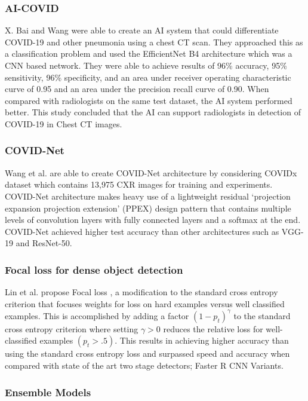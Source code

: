 \documentclass{sigkddExp}
\begin{document}
\subsubsection{AI-COVID}

X. Bai and Wang \cite{pmid32339081} were able to create an AI system that could
differentiate COVID-19 and other pneumonia using a chest CT scan. They
approached this as a classification problem and used the EfficientNet B4
architecture which was a CNN based network. They were able to achieve results of
96\% accuracy, 95\% sensitivity, 96\% specificity, and an area under receiver
operating characteristic curve of 0.95 and an area under the precision recall
curve of 0.90. When compared with radiologists on the same test dataset, the AI
system performed better. This study concluded that the AI can support
radiologists in detection of COVID-19 in Chest CT images.

\subsubsection{COVID-Net}

Wang et al. are able to create COVID-Net \cite{wang2020covidnet} architecture by
considering COVIDx dataset which contains 13,975 CXR images for training and
experiments. COVID-Net architecture makes heavy use of a lightweight residual
‘projection expansion projection extension’ (PPEX) design pattern that contains
multiple levels of convolution layers with fully connected layers and a softmax
at the end. COVID-Net achieved higher test accuracy than other architectures
such as VGG-19 and ResNet-50.


\subsubsection{Focal loss for dense object detection}

Lin et al. propose Focal loss \cite{lin2018focal}, a
modification to the standard cross entropy criterion that focuses weights for
loss on hard examples versus well classified examples. This is accomplished by
adding a factor $(1 - p_t)^\gamma$ to the standard cross entropy criterion where
setting $\gamma  > 0$ reduces the relative loss for well-classified examples
$(p_t > .5)$. This results in achieving higher accuracy than using the standard
cross entropy loss and surpassed speed and accuracy when compared with state of
the art two stage detectors; Faster R CNN Variants.

\subsubsection{Ensemble Models}
\end{document}
